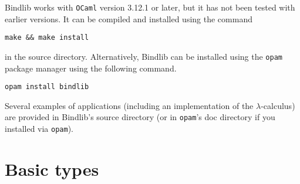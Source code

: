 \documentclass[11pt]{article}
\begin{document}
Bindlib works with \verb#OCaml# version 3.12.1 or later, but it has not been
tested with earlier versions. It can be compiled and installed using the
command
\begin{center}
  \verb#make && make install#
\end{center}
in the source directory. Alternatively, Bindlib can be installed using the
\verb#opam# package manager using the following command.
\begin{center}
  \verb#opam install bindlib#
\end{center}

Several examples of applications (including an implementation of the
$\lambda$-calculus) are provided in Bindlib's source directory (or in
\verb#opam#'s doc directory if you installed via \verb#opam#).

\section{Basic types}
\end{document}
